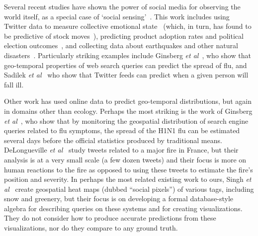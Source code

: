 \documentclass[10pt,journal,compsoc]{IEEEtran}
\begin{document}
 Several recent studies have
shown the power of social media  for observing
the world itself, as a special case of
`social sensing'~\cite{Aggarwal:2013vh}.
This
work includes using Twitter data to measure collective emotional
state~\cite{Golder:2011cy} (which, in turn, has found to
be predictive of stock  moves~\cite{bollen11twitter}),
predicting product adoption rates and political election
outcomes~\cite{jin10prediction}, and collecting data about
earthquakes and other natural disasters~\cite{Sakaki:2010uv}.
Particularly striking examples include Ginsberg
\textit{et al}~\cite{ginsberg09flu}, who show that 
geo-temporal properties of web search queries can
predict the spread of flu, and 
Sadilek \textit{et al}~\cite{Sadilek:2012wp} who show that
Twitter feeds can predict when a given person will
fall ill.


Other work has used online data to predict geo-temporal distributions,
but again in domains other than ecology.  Perhaps the most
striking is the work of Ginsberg \textit{et al}~\cite{ginsberg09flu},
who show that by monitoring the geospatial distribution of search
engine queries related to flu symptoms, the spread of the H1N1
flu can be estimated several days before the official statistics produced by traditional
means.
DeLongueville \textit{et
  al}~\cite{delongueville09} study tweets related to a major fire in
France, but their analysis is at a very small scale (a few dozen
tweets) and their focus is more on human reactions to the fire as
opposed to using these tweets to estimate the fire's position and
severity.  In perhaps the most related existing work to ours,
 Singh \textit{et al}~\cite{singh10socialpixels} create
geospatial heat maps (dubbed ``social pixels'') of various
tags, including snow and greenery, but their focus is on developing a
formal database-style algebra for describing queries on these systems
and for creating visualizations. They do not consider how to produce
accurate predictions from these visualizations, nor do they compare to
any ground truth.
\end{document}
